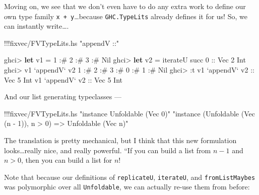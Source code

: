 \documentclass[]{article}
\newenvironment{Shaded}{}{}
\newcommand{\KeywordTok}[1]{\textcolor[rgb]{0.00,0.44,0.13}{\textbf{{#1}}}}
\newcommand{\DataTypeTok}[1]{\textcolor[rgb]{0.56,0.13,0.00}{{#1}}}
\newcommand{\DecValTok}[1]{\textcolor[rgb]{0.25,0.63,0.44}{{#1}}}
\newcommand{\StringTok}[1]{\textcolor[rgb]{0.25,0.44,0.63}{{#1}}}
\newcommand{\OtherTok}[1]{\textcolor[rgb]{0.00,0.44,0.13}{{#1}}}
\newcommand{\FunctionTok}[1]{\textcolor[rgb]{0.02,0.16,0.49}{{#1}}}
\newcommand{\NormalTok}[1]{{#1}}
\begin{document}
Moving on, we see that we don't even have to do any extra work to define
our own type family \texttt{x\ +\ y}\ldots{}because
\texttt{GHC.TypeLits} already defines it for us! So, we can instantly
write\ldots{}.

\begin{Shaded}
\begin{Highlighting}[]
\FunctionTok{!!!}\NormalTok{fixvec}\FunctionTok{/}\NormalTok{FVTypeLits.hs }\StringTok{"appendV ::"}
\end{Highlighting}
\end{Shaded}

\begin{Shaded}
\begin{Highlighting}[]
\NormalTok{ghci}\FunctionTok{>} \KeywordTok{let} \NormalTok{v1 }\FunctionTok{=} \DecValTok{1} \FunctionTok{:#} \DecValTok{2} \FunctionTok{:#} \DecValTok{3} \FunctionTok{:#} \DataTypeTok{Nil}
\NormalTok{ghci}\FunctionTok{>} \KeywordTok{let} \NormalTok{v2 }\FunctionTok{=} \NormalTok{iterateU succ }\DecValTok{0}\OtherTok{ ::} \DataTypeTok{Vec} \DecValTok{2} \DataTypeTok{Int}
\NormalTok{ghci}\FunctionTok{>} \NormalTok{v1 }\OtherTok{`appendV`} \NormalTok{v2}
\DecValTok{1} \FunctionTok{:#} \DecValTok{2} \FunctionTok{:#} \DecValTok{3} \FunctionTok{:#} \DecValTok{0} \FunctionTok{:#} \DecValTok{1} \FunctionTok{:#} \DataTypeTok{Nil}
\NormalTok{ghci}\FunctionTok{>} \FunctionTok{:}\NormalTok{t v1 }\OtherTok{`appendV` v2 ::} \DataTypeTok{Vec} \DecValTok{5} \DataTypeTok{Int}
\NormalTok{v1 }\OtherTok{`appendV` v2 ::} \DataTypeTok{Vec} \DecValTok{5} \DataTypeTok{Int}
\end{Highlighting}
\end{Shaded}

And our list generating typeclasses ---

\begin{Shaded}
\begin{Highlighting}[]
\FunctionTok{!!!}\NormalTok{fixvec}\FunctionTok{/}\NormalTok{FVTypeLits.hs }\StringTok{"instance Unfoldable (Vec 0)"} \StringTok{"instance (Unfoldable (Vec (n - 1)), n > 0) => Unfoldable (Vec n)"}
\end{Highlighting}
\end{Shaded}

The translation is pretty mechanical, but I think that this new
formulation looks\ldots{}really nice, and really powerful. ``If you can
build a list from \(n - 1\) and \(n > 0\), then you can build a list for
\(n\)!

Note that because our definitions of \texttt{replicateU},
\texttt{iterateU}, and \texttt{fromListMaybes} was polymorphic over all
\texttt{Unfoldable}, we can actually re-use them from before:
\end{document}
